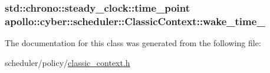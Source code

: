 \hypertarget{classapollo_1_1cyber_1_1scheduler_1_1ClassicContext_abc30359d23f986f35b0c01ff81d6ccc1}{
\subsubsection[{wake\-\_\-time\-\_\-}]{\setlength{\rightskip}{0pt plus 5cm}std\-::chrono\-::steady\-\_\-clock\-::time\-\_\-point apollo\-::cyber\-::scheduler\-::\-Classic\-Context\-::wake\-\_\-time\-\_\-\hspace{0.3cm}{\ttfamily [private]}}}\label{classapollo_1_1cyber_1_1scheduler_1_1ClassicContext_abc30359d23f986f35b0c01ff81d6ccc1}


The documentation for this class was generated from the following file\-:\begin{DoxyCompactItemize}
\item 
scheduler/policy/\hyperlink{classic__context_8h}{classic\-\_\-context.\-h}\end{DoxyCompactItemize}
